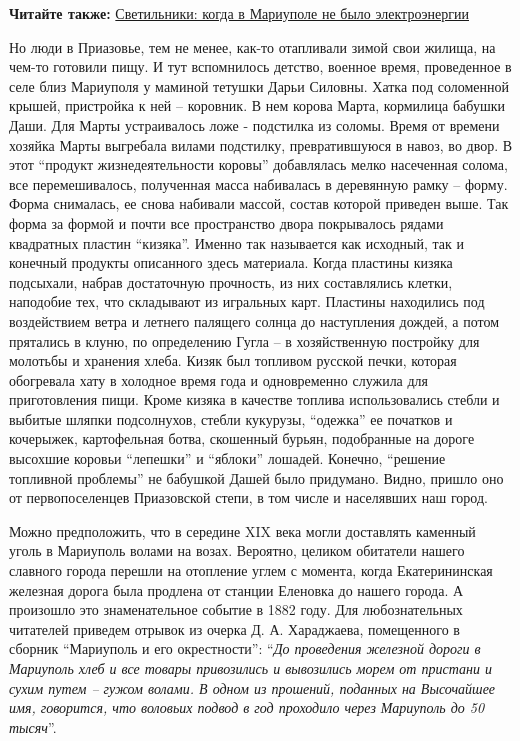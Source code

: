 
\textbf{Читайте также:} \href{https://archive.org/details/08_12_2018.sergij_burov.mrpl_city.svetilniki}{Светильники: когда в Мариуполе не было электроэнергии}

Но люди в Приазовье, тем не менее, как-то отапливали зимой свои жилища, на
чем-то готовили пищу. И тут вспомнилось детство, военное время, проведенное в
селе близ Мариуполя у маминой тетушки Дарьи Силовны. Хатка под соломенной
крышей, пристройка к ней – коровник. В нем корова Марта, кормилица бабушки
Даши. Для Марты устраивалось ложе - подстилка из соломы. Время от времени
хозяйка Марты выгребала вилами подстилку, превратившуюся в навоз, во двор. В
этот \enquote{продукт жизнедеятельности коровы} добавлялась мелко насеченная солома,
все перемешивалось, полученная масса набивалась в деревянную рамку – форму.
Форма снималась, ее снова набивали массой, состав которой приведен выше. Так
форма за формой и почти все пространство двора покрывалось рядами квадратных
пластин \enquote{кизяка}. Именно так называется как исходный, так и конечный продукты
описанного здесь материала. Когда пластины кизяка подсыхали, набрав достаточную
прочность, из них составлялись клетки, наподобие тех, что складывают из
игральных карт. Пластины находились под воздействием ветра и летнего палящего
солнца до наступления дождей, а потом прятались в клуню, по определению Гугла –
в хозяйственную постройку для молотьбы и хранения хлеба. Кизяк был топливом
русской печки, которая обогревала хату в холодное время года и одновременно
служила для приготовления пищи. Кроме кизяка в качестве топлива использовались
стебли и выбитые шляпки подсолнухов, стебли кукурузы, \enquote{одежка} ее початков и
кочерыжек, картофельная ботва, скошенный бурьян, подобранные на дороге высохшие
коровьи \enquote{лепешки} и \enquote{яблоки} лошадей. Конечно, \enquote{решение топливной проблемы} не
бабушкой Дашей было придумано. Видно, пришло оно от первопоселенцев Приазовской
степи, в том числе и населявших наш город.

Можно предположить, что в середине XΙX века могли доставлять каменный уголь в
Мариуполь волами на возах. Вероятно, целиком обитатели нашего славного города
перешли на отопление углем с момента, когда Екатерининская железная дорога была
продлена от станции Еленовка до нашего города. А произошло это знаменательное
событие в 1882 году. Для любознательных читателей приведем отрывок из очерка
Д. А. Хараджаева, помещенного в сборник \enquote{Мариуполь и его окрестности}: \enquote{\em До
проведения железной дороги в Мариуполь хлеб и все товары привозились и
вывозились морем от пристани и сухим путем – гужом волами. В одном из прошений,
поданных на Высочайшее имя, говорится, что воловьих подвод в год проходило
через Мариуполь до 50 тысяч}.

